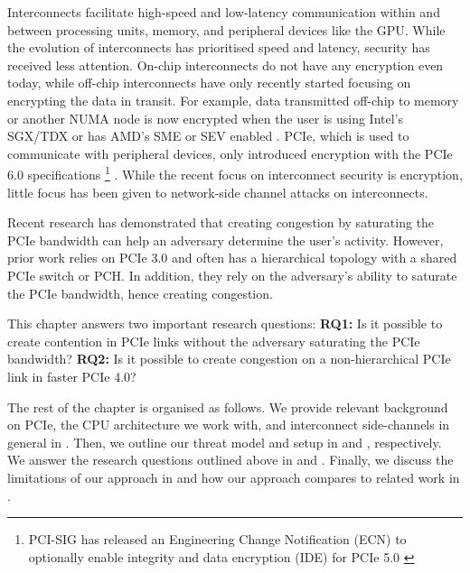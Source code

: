 
Interconnects facilitate high-speed and low-latency communication within and between processing units, memory, and peripheral devices like the GPU.
While the evolution of interconnects has prioritised speed and latency, security has received less attention.
On-chip interconnects do not have any encryption even today, while off-chip interconnects have only recently started focusing on encrypting the data in transit.
For example, data transmitted off-chip to memory or another NUMA node is now encrypted when the user is using Intel's SGX/TDX or has AMD's SME or SEV enabled \cite{intel_upi_encryption, amd_gen_5_arch}.
PCIe, which is used to communicate with peripheral devices, only introduced encryption with the PCIe 6.0 specifications 
\footnote{PCI-SIG has released an Engineering Change Notification (ECN) to optionally enable integrity and data encryption (IDE) for PCIe 5.0 \cite{pcie_ide_v5_ecn}}
\cite{pcie_ide_v6}.
While the recent focus on interconnect security is encryption, little focus has been given to network-side channel attacks on interconnects.

Recent research has demonstrated that creating congestion by saturating the PCIe bandwidth can help an adversary determine the user's activity.
However, prior work relies on PCIe 3.0 and often has a hierarchical topology with a shared PCIe switch or PCH.
In addition, they rely on the adversary's ability to saturate the PCIe bandwidth, hence creating congestion.

This chapter answers two important research questions:
\textbf{RQ1:} Is it possible to create contention in PCIe links without the adversary saturating the PCIe bandwidth?
\textbf{RQ2:} Is it possible to create congestion on a non-hierarchical PCIe link in faster PCIe 4.0?

The rest of the chapter is organised as follows.
We provide relevant background on PCIe, the CPU architecture we work with, and interconnect side-channels in general in . 
Then, we outline our threat model and setup in  and , respectively.
We answer the research questions outlined above in  and .
Finally, we discuss the limitations of our approach in  and how our approach compares to related work in .
